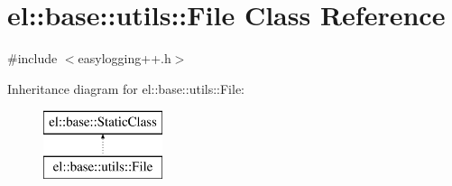 \hypertarget{classel_1_1base_1_1utils_1_1_file}{}\section{el\+:\+:base\+:\+:utils\+:\+:File Class Reference}
\label{classel_1_1base_1_1utils_1_1_file}


{\ttfamily \#include $<$easylogging++.\+h$>$}

Inheritance diagram for el\+:\+:base\+:\+:utils\+:\+:File\+:\begin{figure}[H]
\begin{center}
\leavevmode
\includegraphics[height=2.000000cm]{classel_1_1base_1_1utils_1_1_file}
\end{center}
\end{figure}
